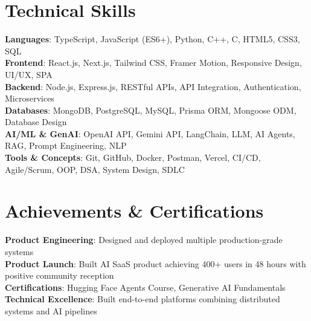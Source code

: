 \documentclass[letterpaper,11pt]{article}
\begin{document}
\section{Technical Skills}
 \begin{itemize}[leftmargin=0.15in, label={}]
    \small{\item{
     \textbf{Languages}{: TypeScript, JavaScript (ES6+), Python, C++, C, HTML5, CSS3, SQL} \\
     \textbf{Frontend}{: React.js, Next.js, Tailwind CSS, Framer Motion, Responsive Design, UI/UX, SPA} \\
     \textbf{Backend}{: Node.js, Express.js, RESTful APIs, API Integration, Authentication, Microservices} \\
     \textbf{Databases}{: MongoDB, PostgreSQL, MySQL, Prisma ORM, Mongoose ODM, Database Design} \\
     \textbf{AI/ML \& GenAI}{: OpenAI API, Gemini API, LangChain, LLM, AI Agents, RAG, Prompt Engineering, NLP} \\
     \textbf{Tools \& Concepts}{: Git, GitHub, Docker, Postman, Vercel, CI/CD, Agile/Scrum, OOP, DSA, System Design, SDLC}
    }}
 \end{itemize}


\section{Achievements \& Certifications}
 \begin{itemize}[leftmargin=0.15in, label={}]
    \small{\item{
     \textbf{Product Engineering}{: Designed and deployed multiple production-grade systems} \\
     \textbf{Product Launch}{: Built AI SaaS product achieving 400+ users in 48 hours with positive community reception} \\
     \textbf{Certifications}{: Hugging Face Agents Course, Generative AI Fundamentals} \\
     \textbf{Technical Excellence}{: Built end-to-end platforms combining distributed systems and AI pipelines}
    }}
 \end{itemize}




\end{document}
